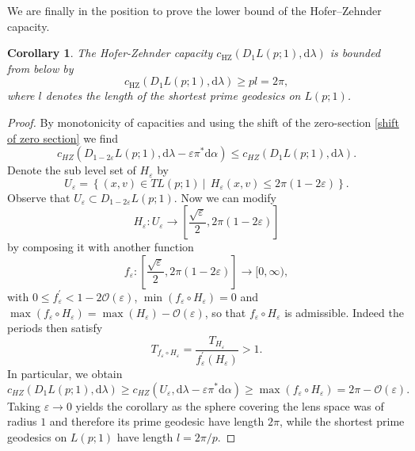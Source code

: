 \documentclass[12pt]{article}
\newtheorem{Corollary}[Definition]{Corollary}
\newcommand{\hz}{\mathrm{HZ}}
\newcommand{\dd}{\mathrm{d}}
\begin{document}
\noindent
We are finally in the position to prove the lower bound of the Hofer--Zehnder capacity.
\begin{Corollary}\label{lower bound Hofer Zehnder capacity}
The Hofer-Zehnder capacity $c_{\hz}(D_1L(p;1),\dd\lambda)$ is bounded from below by  
$$c_{\hz}(D_1L(p;1),\dd\lambda)\geq pl=2\pi,$$
    where $l$ denotes the length of the shortest prime geodesics on $L(p;1)$.
\end{Corollary}
\begin{proof} By monotonicity of capacities and using the shift     of the zero-section \eqref{shift of zero section} we find
    $$
    c_{HZ}(D_{1-2\varepsilon}L(p;1),\dd\lambda-\varepsilon\pi^*\dd\alpha)\leq c_{HZ}(D_1L(p;1),\dd\lambda).
    $$
    Denote the sub level set of $H_\varepsilon$ by
    $$
    U_\varepsilon=\left\lbrace (x,v)\in TL(p;1)\ \Big\vert\ \ H_\varepsilon (x,v) \leq 2\pi(1-2\varepsilon)\right\rbrace.
    $$
    Observe that $U_\varepsilon\subset D_{1-2\varepsilon}L(p;1)$. Now we can modify
    $$H_\varepsilon: U_\varepsilon\to \left [\frac{\sqrt\varepsilon}{2}, 2\pi(1-2\varepsilon)\right ]$$ 
    by composing it with another function 
    $$
    f_{\varepsilon}: \left [\frac{\sqrt\varepsilon}{2}, 2\pi(1-2\varepsilon)\right ]\to [0,\infty),
    $$
    with $0\leq f_{\varepsilon}^{\prime}<1-2\mathcal{O}(\varepsilon)$, $\min(f_{\varepsilon}\circ H_\varepsilon)=0$ and $\max(f_{\varepsilon}\circ H_\varepsilon)=\max(H_{\varepsilon})-\mathcal{O}(\varepsilon)$, so that $f_{\varepsilon}\circ H_\varepsilon$ is admissible. Indeed the periods then satisfy
    $$
    T_{f_{\varepsilon}\circ H_\varepsilon}=\frac{T_{H_\varepsilon}}{f^{\prime}_{\varepsilon}(H_\varepsilon)}>1.
    $$
    In particular, we obtain
    $$
    c_{HZ}(D_1L(p;1),\dd\lambda)\geq c_{HZ}(U_\varepsilon,\dd\lambda-\varepsilon\pi^*\dd\alpha)\geq \max(f_\varepsilon\circ H_\varepsilon)= 2\pi -\mathcal{O}(\varepsilon).
    $$
    Taking $\varepsilon\to 0$ yields the corollary as the sphere covering the lens space was of radius $1$ and therefore its prime geodesic have length $2\pi$, while the shortest prime geodesics on $L(p;1)$ have length $l=2\pi/p$.
\end{proof}
\end{document}
